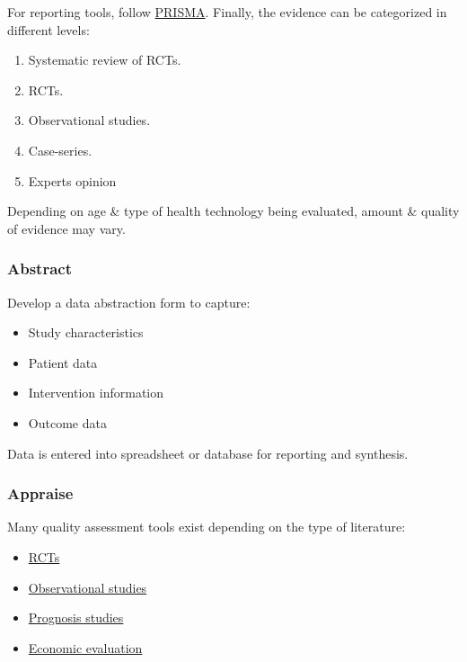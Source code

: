 \documentclass[
]{book}
\providecommand{\tightlist}{%
  \setlength{\itemsep}{0pt}\setlength{\parskip}{0pt}}
\begin{document}
For reporting tools, follow \href{http://www.prisma-statement.org/}{PRISMA}. Finally, the evidence can be categorized in different levels:

\begin{enumerate}
\def\labelenumi{\arabic{enumi}.}
\tightlist
\item
  Systematic review of RCTs.
\item
  RCTs.
\item
  Observational studies.
\item
  Case-series.
\item
  Experts opinion
\end{enumerate}

Depending on age \& type of health technology being evaluated, amount \& quality of evidence may vary.

\hypertarget{abstract}{%
\subsubsection{Abstract}\label{abstract}}

Develop a data abstraction form to capture:

\begin{itemize}
\tightlist
\item
  Study characteristics
\item
  Patient data
\item
  Intervention information
\item
  Outcome data
\end{itemize}

Data is entered into spreadsheet or database for reporting and synthesis.

\hypertarget{appraise}{%
\subsubsection{Appraise}\label{appraise}}

Many quality assessment tools exist depending on the type of literature:

\begin{itemize}
\tightlist
\item
  \href{https://methods.cochrane.org/bias/resources/rob-2-revised-cochrane-risk-bias-tool-randomized-trials}{RCTs}
\item
  \href{https://methods.cochrane.org/methods-cochrane/robins-i-tool}{Observational studies}
\item
  \href{https://www.acpjournals.org/doi/10.7326/M18-1376}{Prognosis studies}
\item
  \href{https://www.nlm.nih.gov/nichsr/edu/healthecon/drummond_list.html}{Economic evaluation}
\end{itemize}
\end{document}
